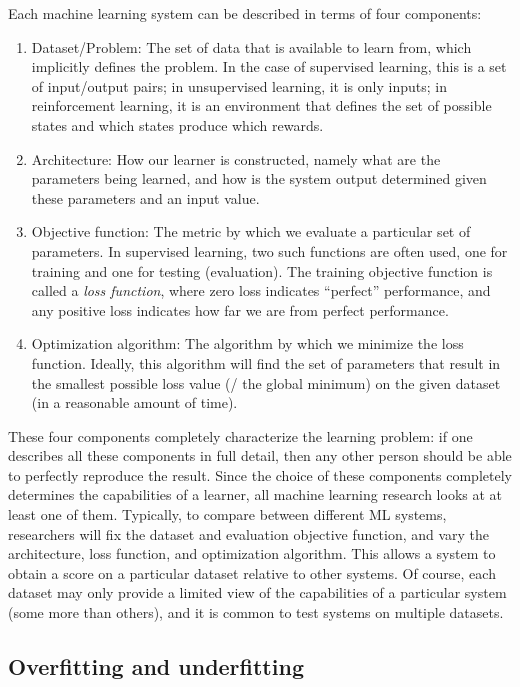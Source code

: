 Each machine learning system can be described in terms of four components:
\begin{enumerate}
  \item Dataset/Problem:
    The set of data that is available to learn from,
    which implicitly defines the problem. In the case of supervised learning,
    this is a set of input/output pairs; in unsupervised learning, it is only
    inputs; in reinforcement learning, it is an environment that defines the
    set of possible states and which states produce which rewards.
  \item Architecture:
    How our learner is constructed,
    namely what are the parameters being learned,
    and how is the system output determined
    given these parameters and an input value.
  \item Objective function:
    The metric by which we evaluate a particular set of parameters.
    In supervised learning, two such functions are often used,
    one for training and one for testing (evaluation).
    The training objective function is called a \emph{loss function},
    where zero loss indicates ``perfect'' performance,
    and any positive loss indicates how far we are from perfect performance.
  \item Optimization algorithm:
    The algorithm by which we minimize the loss function.
    Ideally, this algorithm will find the set of parameters that result
    in the smallest possible loss value (\ie/ the global minimum)
    on the given dataset (in a reasonable amount of time).
\end{enumerate}
These four components completely characterize the learning problem:
if one describes all these components in full detail,
then any other person should be able to perfectly reproduce the result.
Since the choice of these components completely determines
the capabilities of a learner,
all machine learning research looks at at least one of them.
Typically, to compare between different ML systems,
researchers will fix the dataset and evaluation objective function,
and vary the architecture, loss function, and optimization algorithm.
This allows a system to obtain a score on a particular dataset
relative to other systems.
Of course, each dataset may only provide a limited view of the capabilities
of a particular system (some more than others),
and it is common to test systems on multiple datasets.


\subsection{Overfitting and underfitting}

